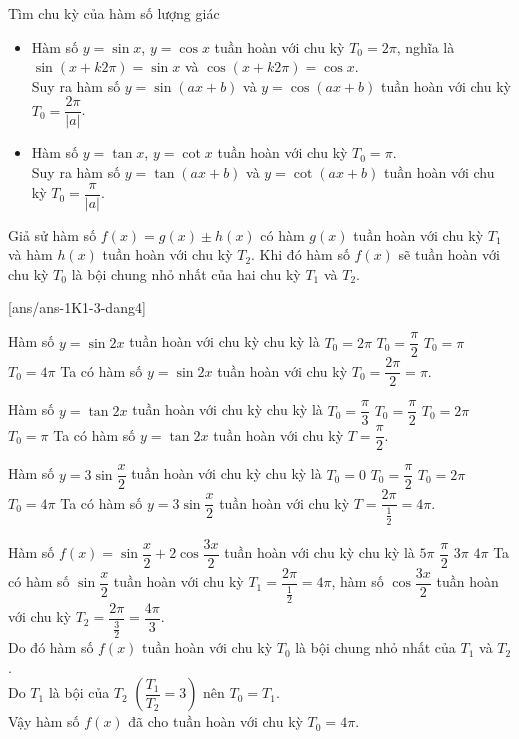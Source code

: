 \begin{dang}{Tìm chu kỳ của hàm số lượng giác}
	\begin{itemize}
		\item Hàm số $y=\sin x$, $y=\cos x$ tuần hoàn với chu kỳ $T_0=2\pi$, nghĩa là $\sin(x+k2\pi)=\sin x$ và $\cos(x+k2\pi)=\cos x$.\\
		      Suy ra hàm số $y=\sin(ax+b)$ và $y=\cos(ax+b)$ tuần hoàn với chu kỳ $T_0=\dfrac{2\pi}{|a|}$.
		\item Hàm số $y=\tan x$, $y=\cot x$ tuần hoàn với chu kỳ $T_0=\pi$.\\
		      Suy ra hàm số $y=\tan(ax+b)$ và $y=\cot(ax+b)$ tuần hoàn với chu kỳ $T_0=\dfrac{\pi}{|a|}$.
	\end{itemize}
	\begin{note}
		Giả sử hàm số $f(x)=g(x)\pm h(x)$ có hàm $g(x)$ tuần hoàn với chu kỳ $T_1$ và hàm $h(x)$ tuần hoàn với chu kỳ $T_2$. Khi đó hàm số $f(x)$ sẽ tuần hoàn với chu kỳ $T_0$ là bội chung nhỏ nhất của hai chu kỳ $T_1$ và $T_2$.
	\end{note}
\end{dang}
\setcounter{ex}{0}
[ans/ans-1K1-3-dang4]
\begin{ex}%
	Hàm số $y=\sin 2x$ tuần hoàn với chu kỳ chu kỳ là
	\choice
	{$T_0=2\pi$}
	{$T_0=\dfrac{\pi}{2}$}
	{\True $T_0=\pi$}
	{$T_0=4\pi$}
	\loigiai
	{
		Ta có hàm số $y=\sin 2x$ tuần hoàn với chu kỳ $T_0=\dfrac{2\pi}{2}=\pi$.
	}
\end{ex}
\begin{ex}%
	Hàm số $y=\tan 2x$ tuần hoàn với chu kỳ chu kỳ là
	\choice
	{$T_0=\dfrac{\pi}{3}$}
	{\True $T_0=\dfrac{\pi}{2}$}
	{$T_0=2\pi$}
	{$T_0=\pi$}
	\loigiai
	{
		Ta có hàm số $y=\tan 2x$ tuần hoàn với chu kỳ $T=\dfrac{\pi}{2}$.
	}
\end{ex}
\begin{ex}%
	Hàm số $y=3\sin\dfrac{x}{2}$ tuần hoàn với chu kỳ chu kỳ là
	\choice
	{$T_0=0$}
	{$T_0=\dfrac{\pi}{2}$}
	{$T_0=2\pi$}
	{\True $T_0=4\pi$}
	\loigiai
	{
		Ta có hàm số $y=3\sin\dfrac{x}{2}$ tuần hoàn với chu kỳ $T=\dfrac{2\pi}{\tfrac{1}{2}}=4\pi$.
	}
\end{ex}
\begin{ex}%
	Hàm số $f(x)=\sin\dfrac{x}{2}+2\cos\dfrac{3x}{2}$ tuần hoàn với chu kỳ chu kỳ là
	\choice
	{$5\pi$}
	{$\dfrac{\pi}{2}$}
	{$3\pi$}
	{\True $4\pi$}
	\loigiai
	{
		Ta có hàm số $\sin\dfrac{x}{2}$ tuần hoàn với chu kỳ $T_1=\dfrac{2\pi}{\tfrac{1}{2}}=4\pi$, hàm số $\cos\dfrac{3x}{2}$ tuần hoàn với chu kỳ $T_2=\dfrac{2\pi}{\tfrac{3}{2}}=\dfrac{4\pi}{3}$.\\
		Do đó hàm số $f(x)$ tuần hoàn với chu kỳ $T_0$ là bội chung nhỏ nhất của $T_1$ và $T_2$.\\
		Do $T_1$ là bội của $T_2$ $\left(\dfrac{T_1}{T_2}=3\right)$ nên $T_0=T_1$.\\
		Vậy hàm số $f(x)$ đã cho tuần hoàn với chu kỳ $T_0=4\pi$.
	}
\end{ex}
